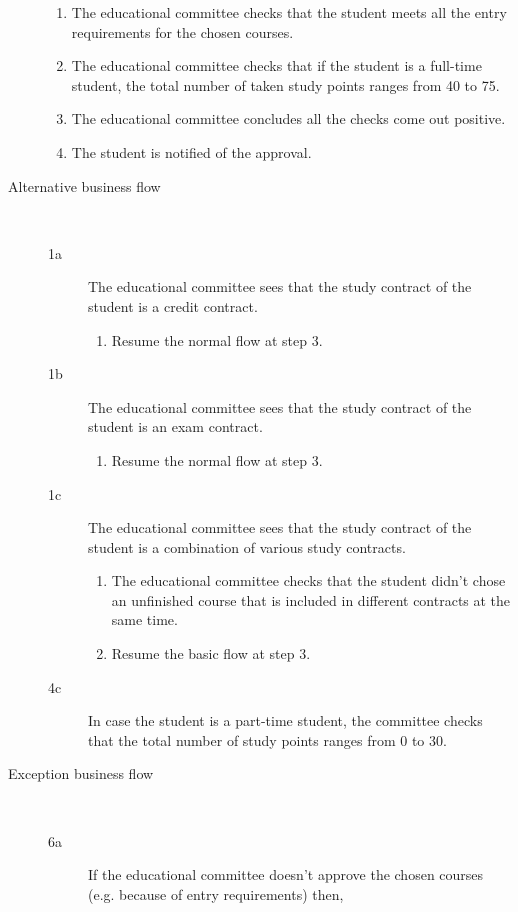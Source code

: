 \begin{description}
\begin{enumerate}
	  	\item The educational committee checks that the student meets all the entry
	  	requirements for the chosen courses.
	  	\item The educational committee checks that if the student is a full-time
	  	student, the total number of taken study points ranges from 40 to 75. 
	  	\item The educational committee concludes all the checks come out positive.
	  	\item The student is notified of the approval.
	\end{enumerate}
	\item[Alternative business flow] \
		\begin{description}
		\item[1a] The educational committee sees that the study contract of the
		student is a credit contract. 
			\begin{enumerate}
			  \item Resume the normal flow at step 3.
			\end{enumerate}
		\item[1b] The educational committee sees that the study contract of the
		student is an exam contract. 
			\begin{enumerate}
			  \item Resume the normal flow at step 3.
			\end{enumerate}
		\item[1c] The educational committee sees that the study contract of the
		student is a combination of various study contracts.
			\begin{enumerate}
			  \item The educational committee checks that the student didn't chose
			  an unfinished course that is included in different contracts at the same
			  time.
			  \item Resume the basic flow at step 3.
			\end{enumerate}
		\item[4c] In case the student is a part-time student, the committee checks
		that the total number of study points ranges from 0 to 30.
		\end{description}
	\item[Exception business flow] \ 
	\begin{description}
		\item[6a] If the educational committee doesn't approve
		the chosen courses (e.g. because of entry requirements) then,
		\begin{enumerate}

\end{enumerate}
\end{description}
\end{description}
